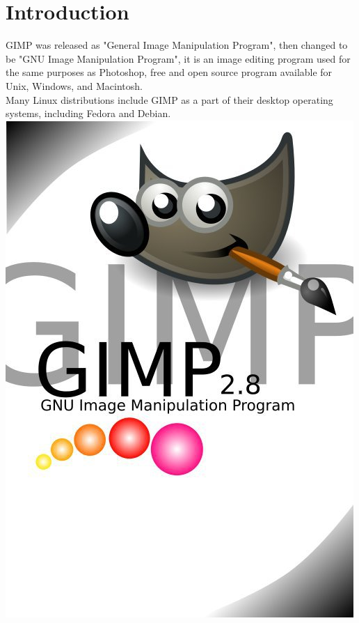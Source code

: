 \chapter{Introduction}
GIMP was released as "General Image Manipulation Program", then changed to be "GNU Image Manipulation Program", it is an image editing program used for the same purposes as Photoshop, free and open source program available for  Unix, Windows, and Macintosh.\\
Many Linux distributions include GIMP as a part of their desktop operating systems, including Fedora and Debian.\\

\includegraphics{GIMP4}
